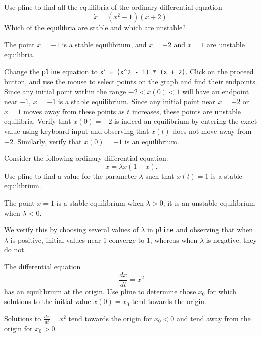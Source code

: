 \documentclass{ximera}
\begin{document}
\begin{exercise} \label{c3.3.2}
Use {\sf pline} to find all the equilibria of the ordinary
differential equation
\[
\dot{x} = (x^2-1)(x+2).
\]
Which of the equilibria are stable and which are unstable?

\begin{solution}

\ans The point $x = -1$ is a stable equilibrium, and $x = -2$ and $x = 1$
are unstable equilibria.

\soln Change the {\tt pline} equation to
{\tt x$'$ = (x\^{}2 - 1) * (x + 2)}.  Click on the proceed button, and
use the mouse to select points on the graph and find their endpoints. 
Since any initial point within the range $-2 < x(0) < 1$ will have an
endpoint near $-1$, $x = -1$ is a stable equilibrium.  Since any initial
point near $x = -2$ or $x = 1$ moves away from these points as $t$
increases, these points are unstable equilibria.  Verify that $x(0)
= -2$ is indeed an equilibrium by entering the exact value using
keyboard input and observing that $x(t)$ does not move away from
$-2$.  Similarly, verify that $x(0) = -1$ is an equilibrium.

\end{solution}
\end{exercise}

\begin{exercise} \label{c3.3.3}
Consider the following ordinary differential equation:
\[
\dot{x} = \lambda x(1-x).
\]
Use {\sf pline} to find a value for the parameter $\lambda$ such
that $x(t)=1$ is a stable equilibrium.

\begin{solution}

\ans The point $x = 1$ is a stable equilibrium when $\lambda > 0$; it is
an unstable equilibrium when $\lambda < 0$. 

\soln We verify this by choosing several values of $\lambda$ in
{\tt pline} and observing that when $\lambda$ is positive, initial values
near $1$ converge to $1$, whereas when $\lambda$ is negative, they do not.

\end{solution}
\end{exercise}

\begin{exercise} \label{c3.3.4}
The differential equation
\[
\frac{dx}{dt} =  x^2
\]
has an equilibrium at the origin.  Use {\sf pline} to determine
those $x_0$ for which solutions to the initial value $x(0)=x_0$ tend
towards the origin.

\begin{solution}

Solutions to $\frac{dx}{dt} = x^2$ tend towards the origin for $x_0 < 0$
and tend away from the origin for $x_0 > 0$.

\end{solution}
\end{exercise}
\end{document}
